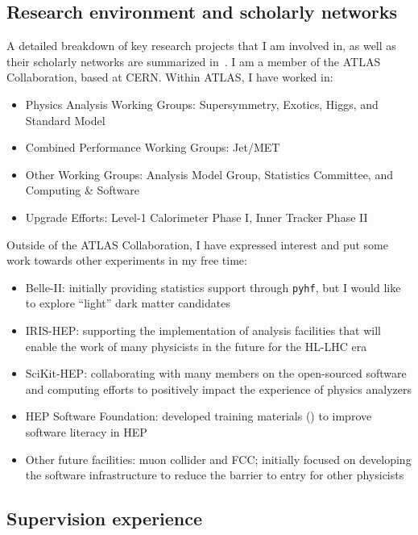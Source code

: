 \subsection{Research environment and scholarly networks}\label{ssec:research-environment-and-scholarly-networks}

A detailed breakdown of key research projects that I am involved in, as well as their scholarly networks are summarized in~. I am a member of the ATLAS Collaboration, based at CERN. Within ATLAS, I have worked in:

\begin{itemize}
	\setlength{\itemsep}{0em}
	\item Physics Analysis Working Groups: Supersymmetry, Exotics, Higgs, and Standard Model
	\item Combined Performance Working Groups: Jet/MET
	\item Other Working Groups: Analysis Model Group, Statistics Committee, and Computing \& Software
	\item Upgrade Efforts: Level-1 Calorimeter Phase I, Inner Tracker Phase II
\end{itemize}

Outside of the ATLAS Collaboration, I have expressed interest and put some work towards other experiments in my free time:

\begin{itemize}
	\setlength{\itemsep}{0em}
	\item Belle-II: initially providing statistics support through \texttt{pyhf}, but I would like to explore \enquote{light} dark matter candidates
	\item IRIS-HEP: supporting the implementation of analysis facilities that will enable the work of many physicists in the future for the HL-LHC era
	\item SciKit-HEP: collaborating with many members on the open-sourced software and computing efforts to positively impact the experience of physics analyzers
	\item HEP Software Foundation: developed training materials () to improve software literacy in HEP
	\item Other future facilities: muon collider and FCC; initially focused on developing the software infrastructure to reduce the barrier to entry for other physicists
\end{itemize}

\subsection{Supervision experience}\label{ssec:supervision-experience}
